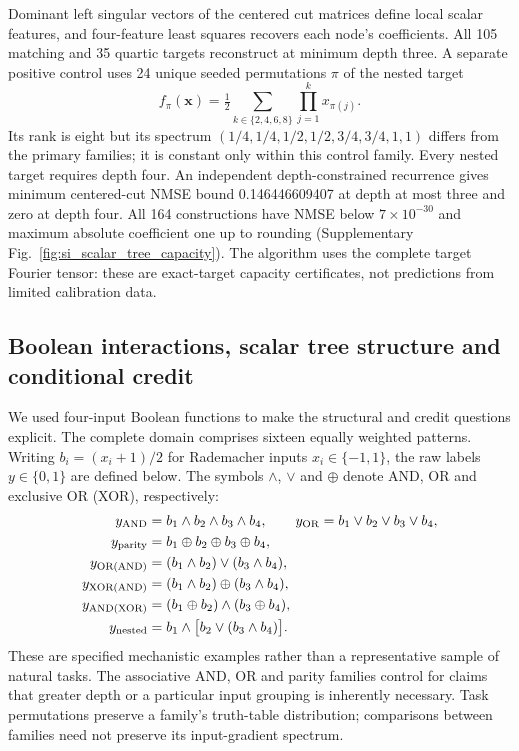 Dominant left singular vectors of the centered cut matrices define local
scalar features, and four-feature least squares recovers each node's
coefficients. All 105 matching and 35 quartic targets reconstruct at minimum
depth three. A separate positive control uses 24 unique seeded permutations
$\pi$ of the nested target
\begin{equation}
 f_\pi(\bm x)=\tfrac12\sum_{k\in\{2,4,6,8\}}
                         \prod_{j=1}^k x_{\pi(j)}.
\end{equation}
Its rank is eight but its spectrum
$(1/4,1/4,1/2,1/2,3/4,3/4,1,1)$ differs from the primary families; it is
constant only within this control family. Every nested target requires
depth four. An independent depth-constrained recurrence gives minimum
centered-cut NMSE bound 0.146446609407 at depth at most three and zero at
depth four. All 164 constructions have NMSE below $7\times10^{-30}$ and
maximum absolute coefficient one up to rounding
(Supplementary Fig.~\ref{fig:si_scalar_tree_capacity}). The algorithm
uses the complete target Fourier tensor: these are exact-target capacity
certificates, not predictions from limited calibration data.

\subsection{Boolean interactions, scalar tree structure and conditional credit}
\label{note:boolean_morphology}

We used four-input Boolean functions to make the structural and credit
questions explicit. The complete domain comprises sixteen equally weighted
patterns. Writing $b_i=(x_i+1)/2$ for Rademacher inputs $x_i\in\{-1,1\}$, the
raw labels $y\in\{0,1\}$ are defined below. The symbols $\land$,
$\lor$ and $\oplus$ denote AND, OR and exclusive OR (XOR), respectively:
\begin{align}
 y_{\rm AND}&=b_1\land b_2\land b_3\land b_4,\qquad
 y_{\rm OR}=b_1\lor b_2\lor b_3\lor b_4,\\
 y_{\rm parity}&=b_1\oplus b_2\oplus b_3\oplus b_4,\\
 y_{\rm OR(AND)}&=(b_1\land b_2)\lor(b_3\land b_4),\\
 y_{\rm XOR(AND)}&=(b_1\land b_2)\oplus(b_3\land b_4),\\
 y_{\rm AND(XOR)}&=(b_1\oplus b_2)\land(b_3\oplus b_4),\\
 y_{\rm nested}&=b_1\land\bigl[b_2\lor(b_3\land b_4)\bigr].
\end{align}
These are specified mechanistic examples rather than a representative
sample of natural tasks. The associative AND, OR and parity families control
for claims that greater depth or a particular input grouping is inherently
necessary. Task permutations preserve a family's truth-table distribution;
comparisons between families need not preserve its input-gradient spectrum.

